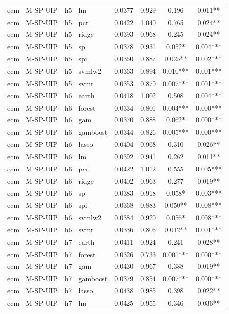 \begin{ThreePartTable}
\begin{longtable}[t]{llclcccc}
ecm & M-SP-UIP & h5 & lm & 0.0377 & 0.929 & 0.196 & 0.011**\\
ecm & M-SP-UIP & h5 & pcr & 0.0422 & 1.040 & 0.765 & 0.024**\\
ecm & M-SP-UIP & h5 & ridge & 0.0393 & 0.968 & 0.245 & 0.024**\\
ecm & M-SP-UIP & h5 & sp & 0.0378 & 0.931 & 0.052* & 0.004***\\
ecm & M-SP-UIP & h5 & spi & 0.0360 & 0.887 & 0.025** & 0.002***\\
ecm & M-SP-UIP & h5 & svmlw2 & 0.0363 & 0.894 & 0.010*** & 0.001***\\
ecm & M-SP-UIP & h5 & svmr & 0.0353 & 0.870 & 0.007*** & 0.001***\\
\addlinespace
ecm & M-SP-UIP & h6 & earth & 0.0418 & 1.002 & 0.508 & 0.004***\\
ecm & M-SP-UIP & h6 & forest & 0.0334 & 0.801 & 0.004*** & 0.000***\\
ecm & M-SP-UIP & h6 & gam & 0.0370 & 0.888 & 0.062* & 0.000***\\
ecm & M-SP-UIP & h6 & gamboost & 0.0344 & 0.826 & 0.005*** & 0.000***\\
ecm & M-SP-UIP & h6 & lasso & 0.0404 & 0.968 & 0.310 & 0.026**\\
ecm & M-SP-UIP & h6 & lm & 0.0392 & 0.941 & 0.262 & 0.011**\\
ecm & M-SP-UIP & h6 & pcr & 0.0422 & 1.012 & 0.555 & 0.005***\\
ecm & M-SP-UIP & h6 & ridge & 0.0402 & 0.963 & 0.277 & 0.019**\\
ecm & M-SP-UIP & h6 & sp & 0.0383 & 0.918 & 0.058* & 0.003***\\
ecm & M-SP-UIP & h6 & spi & 0.0368 & 0.883 & 0.050** & 0.008***\\
ecm & M-SP-UIP & h6 & svmlw2 & 0.0384 & 0.920 & 0.056* & 0.008***\\
ecm & M-SP-UIP & h6 & svmr & 0.0336 & 0.806 & 0.012** & 0.001***\\
\addlinespace
ecm & M-SP-UIP & h7 & earth & 0.0411 & 0.924 & 0.241 & 0.028**\\
ecm & M-SP-UIP & h7 & forest & 0.0326 & 0.733 & 0.001*** & 0.000***\\
ecm & M-SP-UIP & h7 & gam & 0.0430 & 0.967 & 0.388 & 0.019**\\
ecm & M-SP-UIP & h7 & gamboost & 0.0379 & 0.854 & 0.007*** & 0.000***\\
ecm & M-SP-UIP & h7 & lasso & 0.0438 & 0.985 & 0.398 & 0.022**\\
ecm & M-SP-UIP & h7 & lm & 0.0425 & 0.955 & 0.346 & 0.036**\\

\end{longtable}
\end{ThreePartTable}
